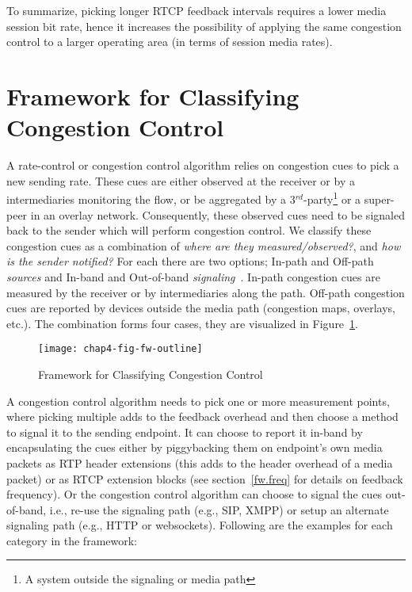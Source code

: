 To summarize, picking longer RTCP feedback intervals requires a lower media
session bit rate, hence it increases the possibility of applying the same
congestion control to a larger operating area (in terms of session media
rates).

\section{Framework for Classifying Congestion Control}
\label{fw.fw}

A rate-control or congestion control algorithm relies on congestion cues to
pick a new sending rate. These cues are either observed at the receiver or by
a intermediaries monitoring the flow, or be aggregated by a
3$^{rd}$-party\footnote{A system outside the signaling or media path} or a
super-peer in an overlay network. Consequently, these observed cues need to be
signaled back to the sender which will perform congestion control. We classify
these congestion cues as a combination of \emph{where are they
measured/observed?}, and \emph{how is the sender notified?} For each there are
two options; In-path and Off-path \emph{sources} and In-band and Out-of-band 
\emph{signaling}~\cite{Singh:PhDFw}. In-path congestion cues are measured
by the receiver or by intermediaries along the path. Off-path congestion
cues are reported by devices outside the media path (congestion maps,
overlays, etc.). The combination forms four cases, they are visualized in
Figure~\ref{fig:4:fw}.

\begin{figure}
\texttt{[image: chap4-fig-fw-outline]}
\caption{Framework for Classifying Congestion Control~\cite{Singh:PhDFw}}
\label{fig:4:fw}
\end{figure}

A congestion control algorithm needs to pick one or more measurement points,
where picking multiple adds to the feedback overhead and then choose a method
to signal it to the sending endpoint. It can choose to report it in-band by
encapsulating the cues either by piggybacking them on endpoint's own media
packets as RTP header extensions (this adds to the header overhead of a media
packet) or as RTCP extension blocks (see section~\ref{fw.freq} for details on
feedback frequency). Or the congestion control algorithm can choose to signal
the cues out-of-band, i.e., re-use the signaling path (e.g., SIP, XMPP) or
setup an alternate signaling path (e.g., HTTP or websockets). Following are
the examples for each category in the framework:

